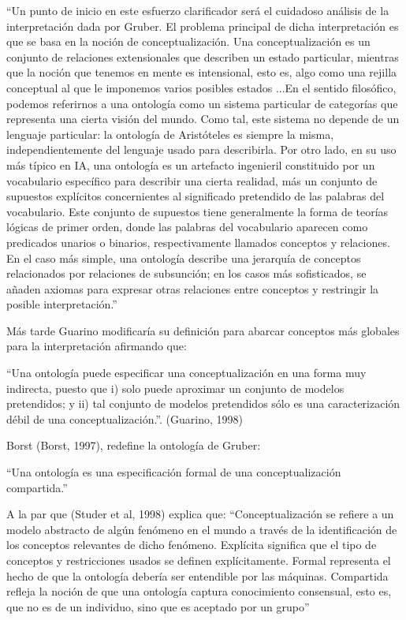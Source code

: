 “Un punto de inicio en este esfuerzo clarificador será el cuidadoso análisis de la       interpretación dada por Gruber. El problema principal de dicha interpretación es que se basa en la noción de conceptualización. Una conceptualización es un conjunto de relaciones extensionales que describen un estado particular, mientras que la noción que tenemos en mente es intensional, esto es, algo como una rejilla conceptual al que le imponemos varios posibles estados ...En el sentido filosófico, podemos referirnos a una ontología como un sistema particular de categorías que representa una cierta visión del mundo. Como tal, este sistema no        depende de un lenguaje particular: la ontología de Aristóteles es siempre la misma,       independientemente del lenguaje usado para describirla. Por otro lado, en su uso más típico en IA, una ontología es un artefacto ingenieril constituido por un vocabulario específico para describir una cierta realidad, más un conjunto de supuestos explícitos concernientes al significado pretendido de las palabras del vocabulario. Este conjunto de supuestos tiene generalmente la forma de teorías lógicas de primer orden, donde las palabras del vocabulario aparecen como predicados unarios o binarios, respectivamente llamados conceptos y relaciones. En el caso más simple, una ontología describe una jerarquía de conceptos relacionados por relaciones de subsunción; en los casos más sofisticados, se añaden axiomas para expresar otras relaciones entre conceptos y restringir la posible interpretación.”

Más tarde Guarino modificaría su definición para abarcar conceptos más globales para la interpretación afirmando que: 

“Una ontología puede especificar una conceptualización en una forma muy indirecta, puesto que i) solo puede aproximar un conjunto de modelos pretendidos; y ii) tal conjunto de modelos pretendidos sólo es una caracterización débil de una conceptualización.”. (Guarino, 1998)

Borst (Borst, 1997), redefine la ontología de Gruber:

“Una ontología es una especificación formal de una conceptualización compartida.” 

A la par que (Studer et al, 1998) explica que:
“Conceptualización se refiere a un modelo abstracto de algún fenómeno en el mundo a través de la identificación de los conceptos relevantes de dicho fenómeno. Explícita significa que el tipo de conceptos y restricciones usados se definen explícitamente. Formal representa el hecho de que la ontología debería ser entendible por las máquinas. Compartida refleja la noción de que una ontología captura conocimiento consensual, esto es, que no es de un individuo, sino que es aceptado por un grupo” 


